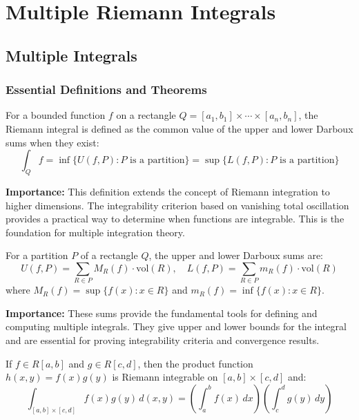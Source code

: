 \chapter{Multiple Riemann Integrals}
\section{Multiple Integrals}

\subsection*{Essential Definitions and Theorems}

\begin{definition}
For a bounded function $f$ on a rectangle $Q = [a_1, b_1] \times \cdots \times [a_n, b_n]$, the Riemann integral is defined as the common value of the upper and lower Darboux sums when they exist:
\[\int_Q f = \inf\{U(f, P) : P \text{ is a partition}\} = \sup\{L(f, P) : P \text{ is a partition}\}\]
\end{definition}

\noindent\textbf{Importance:} This definition extends the concept of Riemann integration to higher dimensions. The integrability criterion based on vanishing total oscillation provides a practical way to determine when functions are integrable. This is the foundation for multiple integration theory.



\begin{definition}
For a partition $P$ of a rectangle $Q$, the upper and lower Darboux sums are:
\[U(f, P) = \sum_{R \in P} M_R(f) \cdot \text{vol}(R), \quad L(f, P) = \sum_{R \in P} m_R(f) \cdot \text{vol}(R)\]
where $M_R(f) = \sup\{f(x) : x \in R\}$ and $m_R(f) = \inf\{f(x) : x \in R\}$.
\end{definition}

\noindent\textbf{Importance:} These sums provide the fundamental tools for defining and computing multiple integrals. They give upper and lower bounds for the integral and are essential for proving integrability criteria and convergence results.



\begin{theorem}
If $f \in R[a, b]$ and $g \in R[c, d]$, then the product function $h(x, y) = f(x)g(y)$ is Riemann integrable on $[a, b] \times [c, d]$ and:
\[\int_{[a,b] \times [c,d]} f(x)g(y) \, d(x, y) = \left(\int_a^b f(x) \, dx\right) \left(\int_c^d g(y) \, dy\right)\]
\end{theorem}

